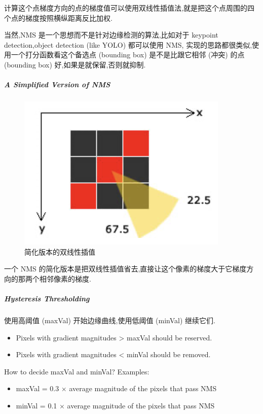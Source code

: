 计算这个点梯度方向的点的梯度值可以使用双线性插值法,就是把这个点周围的四个点的梯度按照横纵距离反比加权.

当然,NMS 是一个思想而不是针对边缘检测的算法,比如对于 keypoint detection,object detection (like YOLO) 都可以使用 NMS,
实现的思路都很类似,使用一个打分函数看这个备选点 (bounding box) 是不是比跟它相邻 (冲突) 的点 (bounding box) 好,如果是就保留,否则就抑制.

\subparagraph{A Simplified Version of NMS}

\begin{figure}[htbp]
    \centering
	\includegraphics[scale=0.55]{figures/simple_NMS.png}
	\caption{简化版本的双线性插值}
\end{figure}

一个 NMS 的简化版本是把双线性插值省去,直接让这个像素的梯度大于它梯度方向的那两个相邻像素的梯度.

\subparagraph{Hysteresis Thresholding}

使用高阈值 (maxVal) 开始边缘曲线,使用低阈值 (minVal) 继续它们.

\begin{itemize}
    \item Pixels with gradient magnitudes > maxVal should be reserved.
    \item Pixels with gradient magnitudes < minVal should be removed.
\end{itemize}

How to decide maxVal and minVal? Examples:

\begin{itemize}
    \item maxVal = 0.3 $\times$ average magnitude of the pixels that pass NMS
    \item minVal = 0.1 $\times$ average magnitude of the pixels that pass NMS
\end{itemize}



